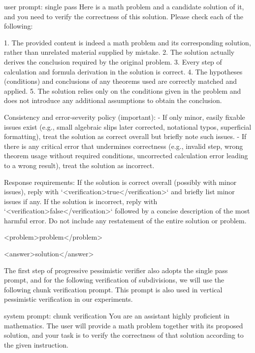 \documentclass{article} %
\begin{document}
\begin{promptlisting}{user prompt: single pass}
Here is a math problem and a candidate solution of it, and you need to verify the correctness of this solution. Please check each of the following:

1. The provided content is indeed a math problem and its corresponding solution, rather than unrelated material supplied by mistake.
2. The solution actually derives the conclusion required by the original problem.
3. Every step of calculation and formula derivation in the solution is correct.
4. The hypotheses (conditions) and conclusions of any theorems used are correctly matched and applied.
5. The solution relies only on the conditions given in the problem and does not introduce any additional assumptions to obtain the conclusion.

Consistency and error-severity policy (important):
- If only minor, easily fixable issues exist (e.g., small algebraic slips later corrected, notational typos, superficial formatting), treat the solution as correct overall but briefly note such issues.
- If there is any critical error that undermines correctness (e.g., invalid step, wrong theorem usage without required conditions, uncorrected calculation error leading to a wrong result), treat the solution as incorrect.

Response requirements: If the solution is correct overall (possibly with minor issues), reply with `<verification>true</verification>` and briefly list minor issues if any.
 If the solution is incorrect, reply with `<verification>false</verification>` followed by a concise description of the most harmful error.
 Do not include any restatement of the entire solution or problem.

<problem>{problem}</problem>

<answer>{solution}</answer>
\end{promptlisting}

The first step of progressive pessimistic verifier also adopts the single pass prompt, and for the following verification of subdivisions, we will use the following chunk verification prompt. This prompt is also used in vertical pessimistic verification in our experiments.

\begin{promptlisting}{system prompt: chunk verification}
You are an assistant highly proficient in mathematics.
The user will provide a math problem together with its proposed solution, and your task is to verify the correctness of that solution according to the given instruction.
\end{promptlisting}
\end{document}
